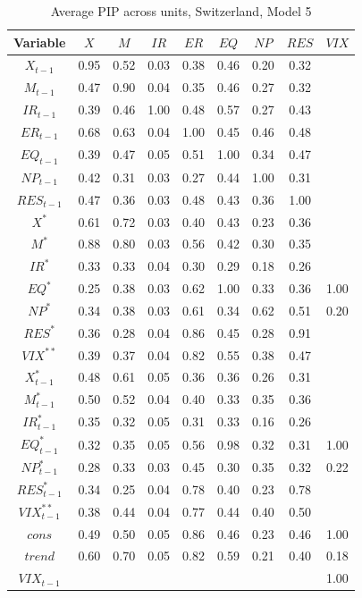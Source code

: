 \documentclass[a4paper, twoside]{templates/ociamthesis}
\begin{document}
\begin{table}[!ht]

\caption{\label{tab:Table55CH5}Average PIP across units, Switzerland, Model 5}
\centering
\fontsize{8}{10}\selectfont
\begin{tabular}[t]{ccccccccc}
\toprule
Variable & $X$ & $M$ & $IR$ & $ER$ & $EQ$ & $NP$ & $RES$ & $VIX$\\
\midrule
$X_{t-1}$ & 0.95 & 0.52 & 0.03 & 0.38 & 0.46 & 0.20 & 0.32 & \\
$M_{t-1}$ & 0.47 & 0.90 & 0.04 & 0.35 & 0.46 & 0.27 & 0.32 & \\
$IR_{t-1}$ & 0.39 & 0.46 & 1.00 & 0.48 & 0.57 & 0.27 & 0.43 & \\
$ER_{t-1}$ & 0.68 & 0.63 & 0.04 & 1.00 & 0.45 & 0.46 & 0.48 & \\
$EQ_{t-1}$ & 0.39 & 0.47 & 0.05 & 0.51 & 1.00 & 0.34 & 0.47 & \\
$NP_{t-1}$ & 0.42 & 0.31 & 0.03 & 0.27 & 0.44 & 1.00 & 0.31 & \\
$RES_{t-1}$ & 0.47 & 0.36 & 0.03 & 0.48 & 0.43 & 0.36 & 1.00 & \\
$X^*$ & 0.61 & 0.72 & 0.03 & 0.40 & 0.43 & 0.23 & 0.36 & \\
$M^*$ & 0.88 & 0.80 & 0.03 & 0.56 & 0.42 & 0.30 & 0.35 & \\
$IR^*$ & 0.33 & 0.33 & 0.04 & 0.30 & 0.29 & 0.18 & 0.26 & \\
$EQ^*$ & 0.25 & 0.38 & 0.03 & 0.62 & 1.00 & 0.33 & 0.36 & 1.00\\
$NP^*$ & 0.34 & 0.38 & 0.03 & 0.61 & 0.34 & 0.62 & 0.51 & 0.20\\
$RES^*$ & 0.36 & 0.28 & 0.04 & 0.86 & 0.45 & 0.28 & 0.91 & \\
$VIX^{**}$ & 0.39 & 0.37 & 0.04 & 0.82 & 0.55 & 0.38 & 0.47 & \\
$X^*_{t-1}$ & 0.48 & 0.61 & 0.05 & 0.36 & 0.36 & 0.26 & 0.31 & \\
$M^*_{t-1}$ & 0.50 & 0.52 & 0.04 & 0.40 & 0.33 & 0.35 & 0.36 & \\
$IR^*_{t-1}$ & 0.35 & 0.32 & 0.05 & 0.31 & 0.33 & 0.16 & 0.26 & \\
$EQ^*_{t-1}$ & 0.32 & 0.35 & 0.05 & 0.56 & 0.98 & 0.32 & 0.31 & 1.00\\
$NP^*_{t-1}$ & 0.28 & 0.33 & 0.03 & 0.45 & 0.30 & 0.35 & 0.32 & 0.22\\
$RES^*_{t-1}$ & 0.34 & 0.25 & 0.04 & 0.78 & 0.40 & 0.23 & 0.78 & \\
$VIX^{**}_{t-1}$ & 0.38 & 0.44 & 0.04 & 0.77 & 0.44 & 0.40 & 0.50 & \\
$cons$ & 0.49 & 0.50 & 0.05 & 0.86 & 0.46 & 0.23 & 0.46 & 1.00\\
$trend$ & 0.60 & 0.70 & 0.05 & 0.82 & 0.59 & 0.21 & 0.40 & 0.18\\
$VIX_{t-1}$ &  &  &  &  &  &  &  & 1.00\\
\bottomrule
\end{tabular}
\end{table}
\end{document}
